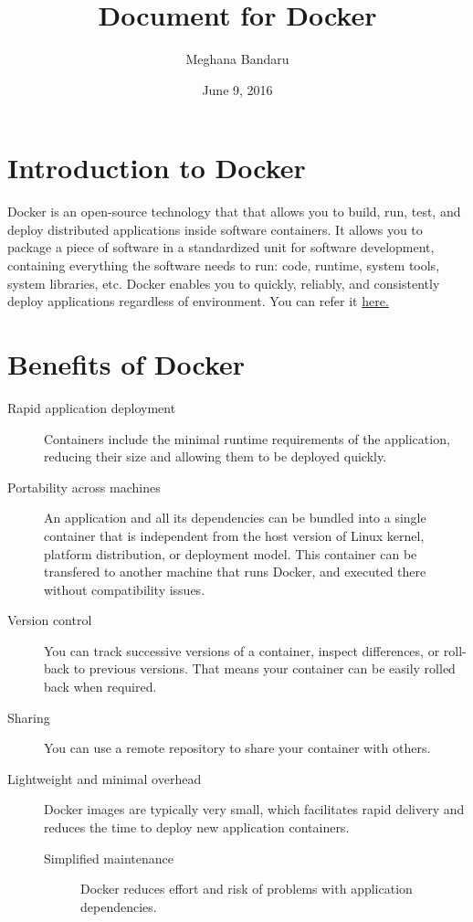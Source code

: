 \documentclass[11pt]{article}
\author{Meghana Bandaru}
\date{June 9, 2016}
\title{Document for Docker}
\begin{document}
\maketitle
\tableofcontents


\section{Introduction to Docker}
\label{sec:orgheadline1}
Docker is an open-source technology that that allows you to build, run, test,
and deploy distributed applications inside software containers. It allows you
to package a piece of software in a standardized unit for software development,
containing everything the software needs to run: code, runtime, system tools,
system libraries, etc. Docker enables you to quickly, reliably, and
consistently deploy applications regardless of environment.
You can refer it \href{https://www.docker.com/what-docker#/copy1}{here.}

\section{Benefits of Docker}
\label{sec:orgheadline2}
\begin{description}
\item[{Rapid application deployment}] Containers include the minimal runtime requirements of the application,
reducing their size and allowing them to be deployed quickly.
\end{description}


\begin{description}
\item[{Portability across machines}] An application and all its dependencies can be bundled into a single
container that is independent from the host
version of Linux kernel, platform distribution, or deployment model. This
container can be transfered to another machine that runs Docker, and
executed there without compatibility issues.

\item[{Version control}] You can track successive versions of a container, inspect differences, or roll-back to previous
versions. That means your container can be easily rolled back when required.

\item[{Sharing}] You can use a remote repository to share your container with others.

\item[{Lightweight and minimal overhead}] Docker images are typically very small, which facilitates rapid delivery
and reduces the time to deploy new application containers.

\begin{description}
\item[{Simplified maintenance}] Docker reduces effort and risk of problems with application dependencies.
\end{description}
\end{description}
\end{document}
